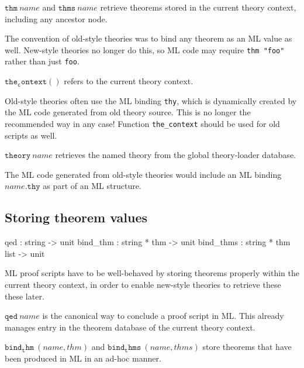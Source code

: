 \begin{descr}
\item [$\mathtt{thm}~name$ and $\mathtt{thms}~name$] retrieve theorems stored
  in the current theory context, including any ancestor node.
  
  The convention of old-style theories was to bind any theorem as an ML value
  as well.  New-style theories no longer do this, so ML code may require
  \texttt{thm~"foo"} rather than just \texttt{foo}.
  
\item [$\mathtt{the_context()}$] refers to the current theory context.
  
  Old-style theories often use the ML binding \texttt{thy}, which is
  dynamically created by the ML code generated from old theory source.  This
  is no longer the recommended way in any case!  Function \texttt{the_context}
  should be used for old scripts as well.
  
\item [$\mathtt{theory}~name$] retrieves the named theory from the global
  theory-loader database.
  
  The ML code generated from old-style theories would include an ML binding
  $name\mathtt{.thy}$ as part of an ML structure.
\end{descr}


\subsection{Storing theorem values}

\begin{ttbox}
qed        : string -> unit
bind_thm   : string * thm -> unit
bind_thms  : string * thm list -> unit
\end{ttbox}

ML proof scripts have to be well-behaved by storing theorems properly within
the current theory context, in order to enable new-style theories to retrieve
these these later.

\begin{descr}
\item [$\mathtt{qed}~name$] is the canonical way to conclude a proof script in
  ML.  This already manages entry in the theorem database of the current
  theory context.
\item [$\mathtt{bind_thm}~(name, thm)$ and $\mathtt{bind_thms}~(name, thms)$]
  store theorems that have been produced in ML in an ad-hoc manner.
\end{descr}

